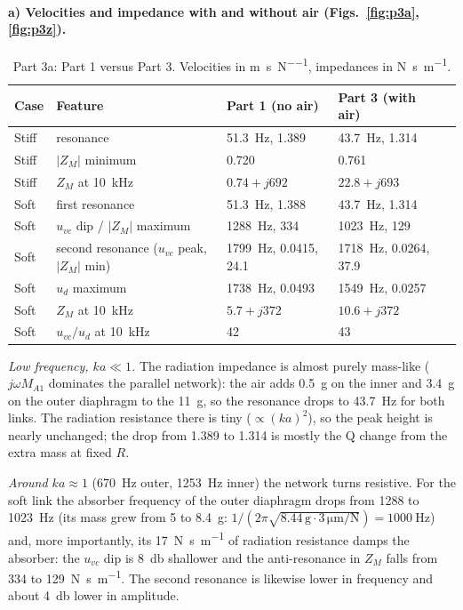 \documentclass[a4paper,11pt]{article}
\newcommand{\jw}{j\omega}
\begin{document}
\FloatBarrier
\paragraph{a) Velocities and impedance with and without air (Figs.~\ref{fig:p3a}, \ref{fig:p3z}).}
\begin{table}[H]\centering\small
\begin{tabular}{@{}lllll@{}}\toprule
Case & Feature & Part 1 (no air) & Part 3 (with air) \\ \midrule
Stiff & resonance & \SI{51.3}{\hertz}, 1.389 & \SI{43.7}{\hertz}, 1.314 \\
Stiff & $|Z_M|$ minimum & 0.720 & 0.761 \\
Stiff & $Z_M$ at \SI{10}{\kilo\hertz} & $0.74 + j692$ & $22.8 + j693$ \\
Soft & first resonance & \SI{51.3}{\hertz}, 1.388 & \SI{43.7}{\hertz}, 1.314 \\
Soft & $u_{vc}$ dip / $|Z_M|$ maximum & \SI{1288}{\hertz}, 334 & \SI{1023}{\hertz}, 129 \\
Soft & second resonance ($u_{vc}$ peak, $|Z_M|$ min) & \SI{1799}{\hertz}, 0.0415, 24.1 & \SI{1718}{\hertz}, 0.0264, 37.9 \\
Soft & $u_d$ maximum & \SI{1738}{\hertz}, 0.0493 & \SI{1549}{\hertz}, 0.0257 \\
Soft & $Z_M$ at \SI{10}{\kilo\hertz} & $5.7 + j372$ & $10.6 + j372$ \\
Soft & $u_{vc}/u_d$ at \SI{10}{\kilo\hertz} & 42 & 43 \\
\bottomrule\end{tabular}
\caption{Part 3a: Part 1 versus Part 3. Velocities in \si{\metre\per\second\per\newton}, impedances in \si{\newton\second\per\metre}.}
\end{table}

\emph{Low frequency, $ka\ll1$.} The radiation impedance is almost purely mass-like ($\jw M_{A1}$ dominates the parallel
network): the air adds \SI{0.5}{\gram} on the inner and \SI{3.4}{\gram} on the outer diaphragm to the \SI{11}{\gram}, so
the resonance drops to \SI{43.7}{\hertz} for both links. The radiation resistance there is tiny ($\propto(ka)^2$), so the
peak height is nearly unchanged; the drop from 1.389 to 1.314 is mostly the Q change from the extra mass at fixed $R$.

\emph{Around $ka\approx1$} (\SI{670}{\hertz} outer, \SI{1253}{\hertz} inner) the network turns resistive. For the soft
link the absorber frequency of the outer diaphragm drops from 1288 to \SI{1023}{\hertz} (its mass grew from 5 to
\SI{8.4}{\gram}: $1/(2\pi\sqrt{8.44\,\mathrm{g}\cdot 3\,\mathrm{\mu m/N}}) = \SI{1000}{\hertz}$) and, more importantly,
its \SI{17}{\newton\second\per\metre} of radiation resistance damps the absorber: the $u_{vc}$ dip is \SI{8}{\decibel}
shallower and the anti-resonance in $Z_M$ falls from 334 to \SI{129}{\newton\second\per\metre}. The second resonance is
likewise lower in frequency and about \SI{4}{\decibel} lower in amplitude.
\end{document}

